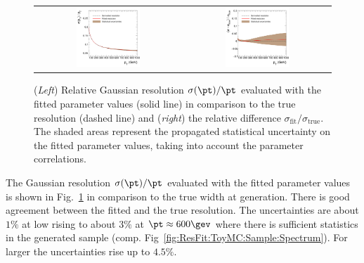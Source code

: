 \begin{figure}[ht]
  \centering
  \begin{tabular}{cc}
    \includegraphics[width=0.45\textwidth]{figures/resFit_ToyMC_PtGenCuts_Sigma} &
    \includegraphics[width=0.45\textwidth]{figures/resFit_ToyMC_PtGenCuts_SigmaRelDifference} \\
  \end{tabular}
  \caption{(\textit{Left}) Relative Gaussian resolution $\sigma(\pt)/\pt$ evaluated with the fitted
    parameter values (solid line) in comparison to the true resolution
    (dashed line) and (\textit{right}) the relative difference
    $\sigma_{\text{fit}} / \sigma_{\text{true}}$.
    The shaded areas represent the propagated statistical
    uncertainty on the fitted parameter values, taking into account the
    parameter correlations.}
  \label{fig:ResFit:ToyMC:PtGenCuts:FittedSigma}
\end{figure}

The Gaussian resolution $\sigma(\pt)/\pt$ evaluated with the fitted
parameter values is shown in Fig.~\ref{fig:ResFit:ToyMC:PtGenCuts:FittedSigma}
in comparison to the true width at generation.
There is good agreement between the fitted and the true resolution.
The uncertainties are about $1\%$ at low \pt rising to
about $3\%$ at $\pt \approx 600\gev$ where there is sufficient statistics in
the generated sample (comp. Fig~\ref{fig:ResFit:ToyMC:Sample:Spectrum}).
For larger \pt the uncertainties rise up to $4.5\%$.

